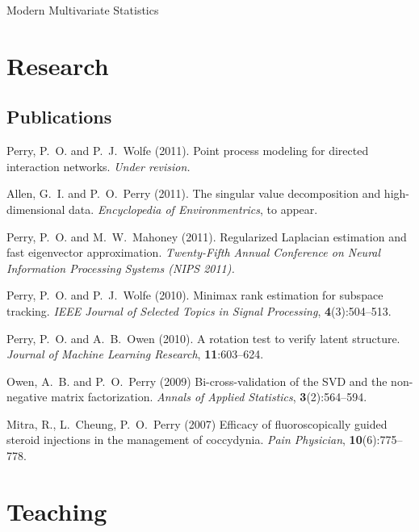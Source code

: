 \documentclass[10pt,letterpaper]{article}
\renewenvironment{itemize}{
  \begin{list}{}{
    \setlength{\leftmargin}{1.5em}
    \setlength{\itemsep}{0.25em}
    \setlength{\parskip}{0pt}
    \setlength{\parsep}{0.25em}
  }
}{
  \end{list}
}
\begin{document}
\begin{itemize}
\item Modern Multivariate Statistics
\end{itemize}


\section*{Research}

\subsection*{Publications}

\begin{itemize}
\item Perry, P.~O. and P.~J.~Wolfe (2011).
Point process modeling for directed interaction networks.
\textit{Under revision.}

\item Allen, G.~I. and P.~O.~Perry (2011).
The singular value decomposition and high-dimensional data.
\textit{Encyclopedia of Environmentrics}, to appear.

\item Perry, P.~O. and M.~W.~Mahoney (2011).
Regularized Laplacian estimation and fast eigenvector approximation.
\textit{Twenty-Fifth Annual Conference on Neural Information Processing Systems (NIPS 2011).} 

\item Perry, P.~O. and P.~J.~Wolfe (2010).
Minimax rank estimation for subspace tracking.
\textit{IEEE Journal of Selected Topics in Signal Processing},
\textbf{4}(3):504--513.

\item Perry, P.~O. and A.~B.~Owen (2010).
A rotation test to verify latent structure.
\textit{Journal of Machine Learning Research},
\textbf{11}:603--624.

\item Owen, A.~B. and P.~O.~Perry (2009)
Bi-cross-validation of the SVD and the non-negative matrix factorization.
\textit{Annals of Applied Statistics},
\textbf{3}(2):564--594.

\item Mitra, R., L.~Cheung, P.~O.~Perry (2007)
Efficacy of fluoroscopically guided steroid injections in the management of coccydynia.
\textit{Pain Physician},
\textbf{10}(6):775--778.
\end{itemize}



\section*{Teaching}
\end{document}
